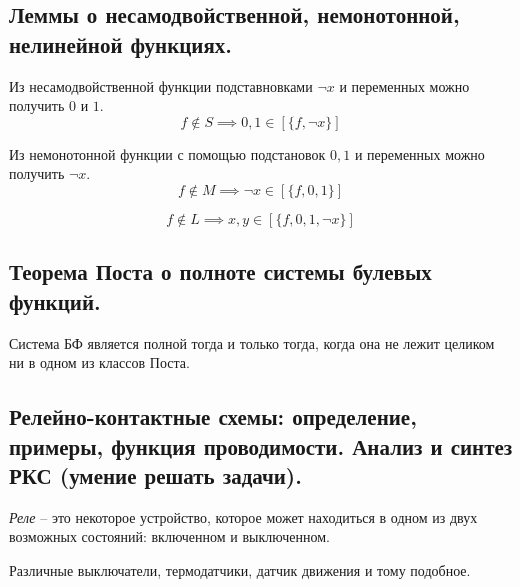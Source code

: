 \newpage

\subsection{Леммы о несамодвойственной, немонотонной, нелинейной функциях.}

\begin{lemma}
    Из несамодвойственной функции подставновками $\lnot x$ и переменных можно получить $0$ и $1$.
    \[
        f \notin S\implies0,1 \in [\{f,\lnot x\}]
    \]
\end{lemma}

\begin{lemma}
    Из немонотонной функции с помощью подстановок $0,1$ и переменных можно получить $\lnot x$.
    \[
        f \notin M\implies\lnot x \in [\{f,0,1\}]
    \]
\end{lemma}

\begin{lemma}
    \[
        f \notin L \implies x,y \in [\{f,0,1,\lnot x\}]
    \]
\end{lemma}

\subsection{Теорема Поста о полноте системы булевых функций.}

\begin{theorem}
    Система БФ является полной тогда и только тогда, когда она не лежит целиком ни в одном из классов Поста.
\end{theorem}

\subsection{Релейно-контактные схемы: определение, примеры, функция проводимости. Анализ и синтез РКС (умение решать задачи).}

\begin{definition}[Реле]
    \emph{Реле} -- это некоторое устройство, которое может находиться в одном из двух возможных состояний: включенном и выключенном.
\end{definition}

\begin{example}
    Различные выключатели, термодатчики, датчик движения и тому подобное.
\end{example}

